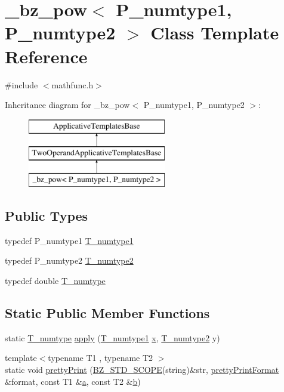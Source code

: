 \hypertarget{class__bz__pow}{}\section{\+\_\+bz\+\_\+pow$<$ P\+\_\+numtype1, P\+\_\+numtype2 $>$ Class Template Reference}
\label{class__bz__pow}


{\ttfamily \#include $<$mathfunc.\+h$>$}

Inheritance diagram for \+\_\+bz\+\_\+pow$<$ P\+\_\+numtype1, P\+\_\+numtype2 $>$\+:\begin{figure}[H]
\begin{center}
\leavevmode
\includegraphics[height=3.000000cm]{class__bz__pow}
\end{center}
\end{figure}
\subsection*{Public Types}
\begin{DoxyCompactItemize}
\item 
typedef P\+\_\+numtype1 \hyperlink{class__bz__pow_a64db2ba97103d451262eafba10ca79cd}{T\+\_\+numtype1}
\item 
typedef P\+\_\+numtype2 \hyperlink{class__bz__pow_a679e644bd021a534bb4ae4aba9c59d99}{T\+\_\+numtype2}
\item 
typedef double \hyperlink{class__bz__pow_add0a0fcd3be75612d7ef367722107a97}{T\+\_\+numtype}
\end{DoxyCompactItemize}
\subsection*{Static Public Member Functions}
\begin{DoxyCompactItemize}
\item 
static \hyperlink{class__bz__pow_add0a0fcd3be75612d7ef367722107a97}{T\+\_\+numtype} \hyperlink{class__bz__pow_a46094da92727279b3d61fe15b4c5cb78}{apply} (\hyperlink{class__bz__pow_a64db2ba97103d451262eafba10ca79cd}{T\+\_\+numtype1} \hyperlink{vecnorm1_8cc_ac73eed9e41ec09d58f112f06c2d6cb63}{x}, \hyperlink{class__bz__pow_a679e644bd021a534bb4ae4aba9c59d99}{T\+\_\+numtype2} y)
\item 
{\footnotesize template$<$typename T1 , typename T2 $>$ }\\static void \hyperlink{class__bz__pow_a15d5fe493483a006860cc573ae96a332}{pretty\+Print} (\hyperlink{numinquire_8h_a2b24ffc3b4ef9803956bc7715c6c7b83}{B\+Z\+\_\+\+S\+T\+D\+\_\+\+S\+C\+O\+P\+E}(string)\&str, \hyperlink{classprettyPrintFormat}{pretty\+Print\+Format} \&format, const T1 \&\hyperlink{gen__mat5files_8m_aae328bf20413f220e38aec4d95bfd6da}{a}, const T2 \&\hyperlink{gen__mat5files_8m_a7b38767b3b6a8dae167e5afa4fc340b0}{b})
\end{DoxyCompactItemize}


